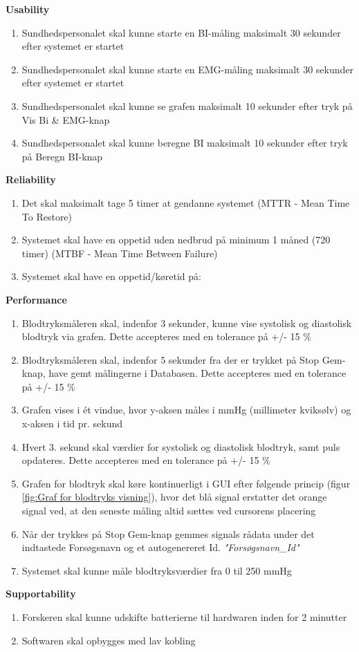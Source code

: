 \documentclass[main.tex]{subfiles}
\begin{document}
\textbf{Usability}
\begin{enumerate}
\item Sundhedspersonalet skal kunne starte en BI-måling maksimalt 30 sekunder efter systemet er startet
\item Sundhedspersonalet skal kunne starte en EMG-måling maksimalt 30 sekunder efter systemet er startet
\item Sundhedspersonalet skal kunne se grafen maksimalt 10 sekunder efter tryk på Vis Bi \& EMG-knap
\item Sundhedspersonalet skal kunne beregne BI maksimalt 10 sekunder efter tryk på Beregn BI-knap
\end{enumerate}
                                                                                                
\textbf{Reliability}
\begin{enumerate}
\item Det skal maksimalt tage 5 timer at gendanne systemet (MTTR - Mean Time To Restore)
\item Systemet skal have en oppetid uden nedbrud på minimum 1 måned (720 timer) (MTBF - Mean Time Between Failure)   
\item Systemet skal have en oppetid/køretid på: 
\end{enumerate}

					
\textbf{Performance}
\begin{enumerate}
\item Blodtryksmåleren skal, indenfor 3 sekunder, kunne vise systolisk og diastolisk blodtryk via grafen. Dette accepteres med en tolerance på +/- 15 \%
\item Blodtryksmåleren skal, indenfor 5 sekunder fra der er trykket på Stop Gem-knap, have gemt målingerne i Databasen. Dette accepteres med en tolerance på +/- 15 \%
\item Grafen vises i ét vindue, hvor y-aksen måles i mmHg (millimeter kviksølv) og x-aksen i tid pr. sekund
\item Hvert 3. sekund skal værdier for systolisk og diastolisk blodtryk, samt puls opdateres. Dette accepteres med en tolerance på +/- 15 \%
\item Grafen for blodtryk skal køre kontinuerligt i GUI efter følgende princip (figur \ref{fig:Graf for blodtryks visning}), hvor det blå signal erstatter det orange signal ved, at den seneste måling altid sættes ved cursorens placering


\item Når der trykkes på Stop Gem-knap gemmes signals rådata under det indtastede Forsøgsnavn og et autogenereret Id. \textit{"Forsøgsnavn\_Id"}
\item Systemet skal kunne måle blodtryksværdier fra 0 til 250 mmHg
\end{enumerate}


\textbf{Supportability}
\begin{enumerate}
\item Forskeren skal kunne udskifte batterierne til hardwaren inden for 2 minutter 
\item Softwaren skal opbygges med lav kobling
\end{enumerate}
\end{document}
